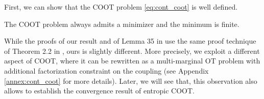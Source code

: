 First, we can show that the COOT problem \eqref{eq:cont_coot} is well defined.
\begin{proposition}
  \label{prop:exist_coot}
  The COOT problem always admits a minimizer and the minimum is finite.
\end{proposition}
While the proofs of our result and of Lemma 35 in \citep{Chowdhury21b} use the same proof technique of
Theorem 2.2 in \citep{Chowdhury19}, ours is slightly different. More precisely,
we exploit a different aspect of COOT, where it can be rewritten as a multi-marginal OT problem
with additional factorization constraint on the coupling (see Appendix \ref{annex:cont_coot}
for more details). Later, we will see that, this observation also allows to establish the
convergence result of entropic COOT.

